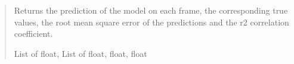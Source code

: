 \documentclass[a4paper,10pt,english]{report}
\begin{document}
\begin{fulllineitems}
\begin{quote}
\begin{description}
\begin{itemize}
\end{itemize}

\sphinxAtStartPar
Returns the prediction of the model on each frame, the corresponding true values, the root mean square error of the predictions and the r2 correlation coefficient.

\sphinxAtStartPar
List of float, List of float, float, float

\end{description}\end{quote}

\end{fulllineitems}

\end{document}
